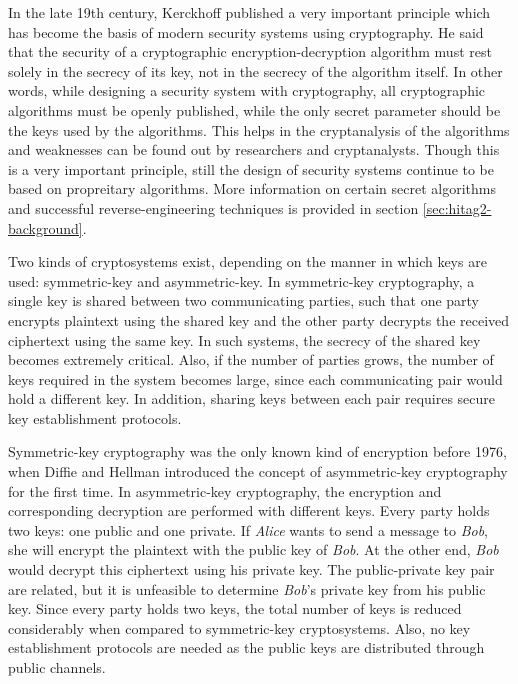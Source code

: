 In the late 19th century, Kerckhoff published a very important principle \cite{kerckhoff} which has become the basis of modern security systems using cryptography. He said that the security of a cryptographic encryption-decryption algorithm must rest solely in the secrecy of its key, not in the secrecy of the algorithm itself. In other words, while designing a security system with cryptography, all cryptographic algorithms must be openly published, while the only secret parameter should be the keys used by the algorithms. This helps in the cryptanalysis of the algorithms and weaknesses can be found out by researchers and cryptanalysts. Though this is a very important principle, still the design of security systems continue to be based on propreitary algorithms. More information on certain secret algorithms and successful reverse-engineering techniques is provided in section \ref{sec:hitag2-background}.

Two kinds of cryptosystems exist, depending on the manner in which keys are used: symmetric-key and asymmetric-key. In symmetric-key cryptography, a single key is shared between two communicating parties, such that one party encrypts plaintext using the shared key and the other party decrypts the received ciphertext using the same key. In such systems, the secrecy of the shared key becomes extremely critical. Also, if the number of parties grows, the number of keys required in the system becomes large, since each communicating pair would hold a different key. In addition, sharing keys between each pair requires secure key establishment protocols. 

Symmetric-key cryptography was the only known kind of encryption before 1976, when Diffie and Hellman introduced the concept of asymmetric-key cryptography \cite{diffie1976ndc} for the first time. In asymmetric-key cryptography, the encryption and corresponding decryption are performed with different keys. Every party holds two keys: one public and one private. If \emph{Alice} wants to send a message to \emph{Bob}, she will encrypt the plaintext with the public key of \emph{Bob}. At the other end, \emph{Bob} would decrypt this ciphertext using his private key. The public-private key pair are related, but it is unfeasible to determine \emph{Bob}'s private key from his public key. Since every party holds two keys, the total number of keys is reduced considerably when compared to symmetric-key cryptosystems. Also, no key establishment protocols are needed as the public keys are distributed through public channels.

